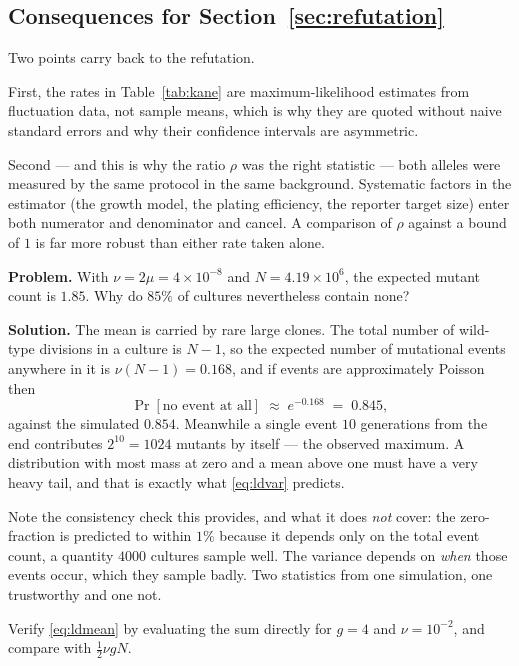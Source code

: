 \subsection{Consequences for Section~\ref{sec:refutation}}

Two points carry back to the refutation.

First, the rates in Table~\ref{tab:kane} are maximum-likelihood estimates from
fluctuation data, not sample means, which is why they are quoted without naive
standard errors and why their confidence intervals are asymmetric.

Second --- and this is why the ratio $\rho$ was the right statistic --- both
alleles were measured by the same protocol in the same background. Systematic
factors in the estimator (the growth model, the plating efficiency, the reporter
target size) enter both numerator and denominator and cancel. A comparison of
$\rho$ against a bound of $1$ is far more robust than either rate taken alone.

\begin{worked}
\textbf{Problem.} With $\nu = 2\mu = 4\times10^{-8}$ and $N = 4.19\times10^{6}$,
the expected mutant count is $1.85$. Why do $85\%$ of cultures nevertheless
contain none?

\textbf{Solution.} The mean is carried by rare large clones. The total number of
wild-type divisions in a culture is $N - 1$, so the expected number of
mutational events anywhere in it is $\nu(N-1) = 0.168$, and if events are
approximately Poisson then
\[
  \Pr[\text{no event at all}] \;\approx\; e^{-0.168} \;=\; 0.845,
\]
against the simulated $0.854$. Meanwhile a single event $10$ generations from the
end contributes $2^{10} = 1024$ mutants by itself --- the observed maximum. A
distribution with most mass at zero and a mean above one must have a very heavy
tail, and that is exactly what \eqref{eq:ldvar} predicts.

Note the consistency check this provides, and what it does \emph{not} cover: the
zero-fraction is predicted to within $1\%$ because it depends only on the total
event count, a quantity $4000$ cultures sample well. The variance depends on
\emph{when} those events occur, which they sample badly. Two statistics from one
simulation, one trustworthy and one not.
\end{worked}

\begin{exercise}
Verify \eqref{eq:ldmean} by evaluating the sum directly for $g = 4$ and
$\nu = 10^{-2}$, and compare with $\tfrac{1}{2}\nu g N$.
\end{exercise}

